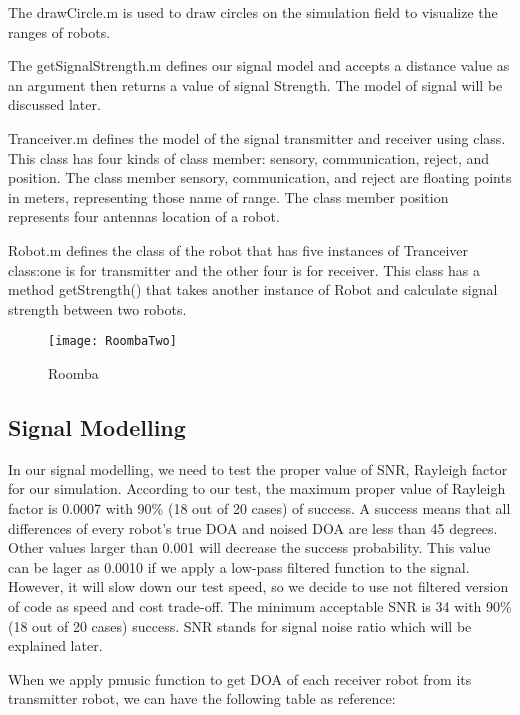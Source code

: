 The drawCircle.m is used to draw circles on the simulation field to visualize the ranges of robots.

The getSignalStrength.m defines our signal model and accepts a distance value as an argument then returns a value of signal Strength. The model of signal will be discussed later.

Tranceiver.m defines the model of the signal transmitter and receiver using class. This class has four kinds of class member: sensory, communication, reject, and position. The class member sensory, communication, and reject are floating points in meters, representing those name of range. The class member position represents four antennas location of a robot.

Robot.m defines the class of the robot that has five instances of Tranceiver class:one is for transmitter and the other four is for receiver. This class has a method getStrength() that takes another instance of Robot and calculate signal strength between two robots. 

\begin{figure}[ht]
	\centering
	\texttt{[image: RoombaTwo]}
	\caption{Roomba}
	\end{figure}

\subsection{Signal Modelling}
In our signal modelling, we need to test the proper value of SNR, Rayleigh factor for our simulation. According to our test, the maximum proper value of Rayleigh factor is 0.0007 with 90\% (18 out of 20 cases) of success. A success means that all differences of every robot's true DOA and noised DOA are less than 45 degrees. Other values larger than 0.001 will decrease the success probability. This value can be lager as 0.0010 if we apply a low-pass filtered function to the signal. However, it will slow down our test speed, so we decide to use not filtered version of code as speed and cost trade-off. The minimum acceptable SNR is 34 with 90\%(18 out of 20 cases) success. SNR stands for signal noise ratio which will be explained later.
\par
	When we apply pmusic function to get DOA of each receiver robot from its transmitter robot, we can have the following table as reference:

